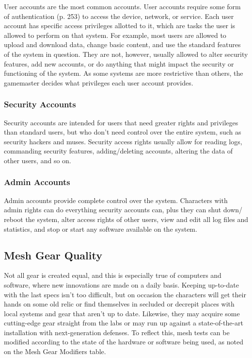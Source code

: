 User accounts are the most common accounts. User 
accounts require some form of authentication (p. 253) 
to access the device, network, or service. Each user account
has specific access privileges allotted to it, which
are tasks the user is allowed to perform on that system. 
For example, most users are allowed to upload and 
download data, change basic content, and use the 
standard features of the system in question. They are 
not, however, usually allowed to alter security features, 
add new accounts, or do anything that might impact 
the security or functioning of the system. As some systems
are more restrictive than others, the gamemaster
decides what privileges each user account provides.

\subsubsection{Security Accounts}

Security accounts are intended for users that need 
greater rights and privileges than standard users, but 
who don't need control over the entire system, such 
as security hackers and muses. Security access rights 
usually allow for reading logs, commanding security 
features, adding/deleting accounts, altering the data of 
other users, and so on.

\subsubsection{Admin Accounts}

Admin accounts provide complete control over the 
system. Characters with admin rights can do everything
security accounts can, plus they can shut down/
reboot the system, alter access rights of other users, 
view and edit all log files and statistics, and stop or 
start any software available on the system.

\subsection{Mesh Gear Quality}

Not all gear is created equal, and this is especially true 
of computers and software, where new innovations 
are made on a daily basis. Keeping up-to-date with 
the last specs isn't too difficult, but on occasion the 
characters will get their hands on some old relic or 
find themselves in secluded or decrepit places with 
local systems and gear that aren't up to date. Likewise, 
they may acquire some cutting-edge gear straight 
from the labs or may run up against a state-of-the-art 
installation with next-generation defenses. To reflect 
this, mesh tests can be modified according to the state 
of the hardware or software being used, as noted on 
the Mesh Gear Modifiers table.

